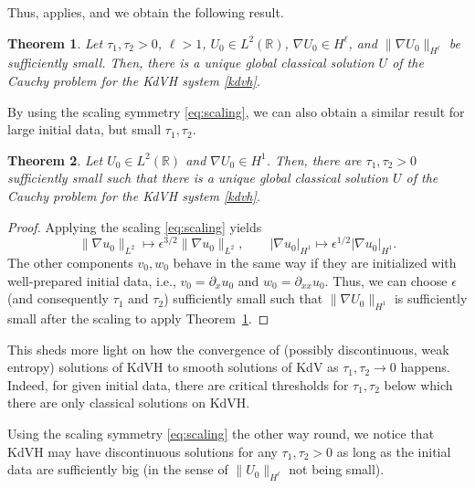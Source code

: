\documentclass{article}
\theoremstyle{plain}
\newtheorem{theorem}{Theorem}
\theoremstyle{definition}
\numberwithin{theorem}{section}
\begin{document}
Thus, \cite[Theorem~5.2.1]{dafermos2010hyperbolic} applies, and we obtain the following result.
\begin{theorem}
\label{thm:small_data}
    Let
    $\tau_1, \tau_2 > 0$,
    $\ell > 1$,
    $U_0 \in L^2(\mathbb{R})$,
    $\nabla U_0 \in H^\ell$, and
    $\|\nabla U_0\|_{H^\ell}$ be sufficiently small.
    Then, there is a unique global classical solution $U$ of the Cauchy problem for the KdVH system \eqref{kdvh}.
\end{theorem}

By using the scaling symmetry \eqref{eq:scaling}, we can also obtain a similar result for large initial data, but small $\tau_1, \tau_2$.
\begin{theorem}
\label{thm:small_tau}
    Let
    $U_0 \in L^2(\mathbb{R})$ and
    $\nabla U_0 \in H^1$.
    Then, there are $\tau_1, \tau_2 > 0$ sufficiently small such that
    there is a unique global classical solution $U$ of the Cauchy problem for the KdVH system \eqref{kdvh}.
\end{theorem}
\begin{proof}
    Applying the scaling \eqref{eq:scaling} yields
    \begin{equation}
        \| \nabla u_0 \|_{L^2} \mapsto \epsilon^{3/2} \| \nabla u_0 \|_{L^2}, \qquad
        | \nabla u_0 |_{H^1} \mapsto \epsilon^{1/2} | \nabla u_0 |_{H^1}.
    \end{equation}
    The other components $v_0, w_0$ behave in the same way if they are initialized with well-prepared initial data, i.e., $v_0 = \partial_x u_0$ and $w_0 = \partial_{xx} u_0$.
    Thus, we can choose $\epsilon$ (and consequently $\tau_1$ and $\tau_2$) sufficiently small such that $\|\nabla U_0\|_{H^1}$ is sufficiently small after the scaling to apply Theorem~\ref{thm:small_data}.
\end{proof}

This sheds more light on how the convergence of (possibly discontinuous, weak entropy) solutions of KdVH to smooth solutions of KdV as $\tau_1, \tau_2 \to 0$ \cite[Theorem~3.2]{giesselmann2025convergence} happens.
Indeed, for given initial data, there are critical thresholds for $\tau_1, \tau_2$ below which there are only classical solutions on KdVH.

Using the scaling symmetry \eqref{eq:scaling} the other way round, we notice that KdVH may have discontinuous solutions for any $\tau_1, \tau_2 > 0$ as long as the initial data are sufficiently big (in the sense of $\| U_0 \|_{H^\ell}$ not being small).
\end{document}
